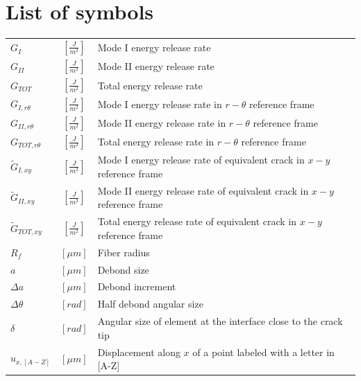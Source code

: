 \documentclass[a4paper]{jpconf}
\begin{document}

\section*{List of symbols}

\begin{tabular}{lcl}
$G_{I}$ & $\left[\frac{J}{m^{2}}\right]$  & Mode I energy release rate\\
$G_{II}$ & $\left[\frac{J}{m^{2}}\right]$  & Mode II energy release rate\\
$G_{TOT}$ & $\left[\frac{J}{m^{2}}\right]$  & Total energy release rate\\
$G_{I,r\theta}$ & $\left[\frac{J}{m^{2}}\right]$  & Mode I energy release rate in $r-\theta$ reference frame\\
$G_{II,r\theta}$ & $\left[\frac{J}{m^{2}}\right]$  & Mode II energy release rate in $r-\theta$ reference frame\\
$G_{TOT,r\theta}$ & $\left[\frac{J}{m^{2}}\right]$  & Total energy release rate in $r-\theta$ reference frame\\
$\widetilde{G}_{I,xy}$ & $\left[\frac{J}{m^{2}}\right]$  & Mode I energy release rate of equivalent crack in $x-y$ reference frame\\
$\widetilde{G}_{II,xy}$ & $\left[\frac{J}{m^{2}}\right]$  & Mode II energy release rate of equivalent crack in $x-y$ reference frame\\
$\widetilde{G}_{TOT,xy}$ & $\left[\frac{J}{m^{2}}\right]$  & Total energy release rate of equivalent crack in $x-y$ reference frame\\
$R_{f}$ & $\left[\mu m\right]$  &Fiber radius\\
$a$ & $\left[\mu m\right]$  &Debond size\\
$\Delta a$ & $\left[\mu m\right]$  &Debond increment\\
$\Delta\theta$ & $\left[rad\right]$  & Half debond angular size\\
$\delta$ & $\left[rad\right]$  & Angular size of element at the interface close to the crack tip\\
$u_{x,[A-Z]}$ & $\left[\mu m\right]$  & Displacement along $x$ of a point labeled with a letter in [A-Z]\\

\end{tabular}
\end{document}
